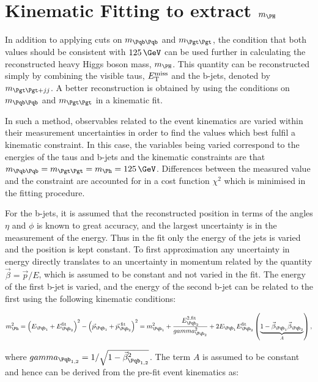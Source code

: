 \section{Kinematic Fitting to extract $m_{\PH}$}
\label{sec:kinematicfit}

In addition to applying cuts on $m_{\Pqb\Pqb}$ and $m_{\Pgt\Pgt}$, the condition that
both values should be consistent with $125\,\GeV$ can be used further in
calculating the reconstructed heavy Higgs boson mass, $m_{\PH}$. This quantity can be reconstructed simply
by combining the visible taus, $E_{\mathrm{T}}^{\text{miss}}$ and the b-jets, denoted by $m_{\Pgt\Pgt+jj}$.
A better reconstruction is obtained by using the conditions on $m_{\Pqb\Pqb}$ and
$m_{\Pgt\Pgt}$ in a kinematic fit. 

In such a method, observables related to the
event kinematics are varied within their measurement uncertainties in order to
find the values which best fulfil a kinematic constraint. In this case, the
variables being varied correspond to the energies of the taus and b-jets and the
kinematic constraints are that $m_{\Pqb\Pqb} = m_{\Pgt\Pgt} = m_{\Ph} = 125\,\GeV$. 
Differences between the measured value and the constraint are accounted for in a cost
function $\chi^{2}$ which is minimised in the fitting procedure.  

For the b-jets, it is assumed that the reconstructed position in terms of the
angles $\eta$ and $\phi$ is known to great accuracy, and the largest
uncertainty is in the measurement of the energy. Thus in the fit only the
energy of the jets is varied and the position is kept constant. To first
approximation any uncertainty in energy directly translates to an uncertainty in
momentum related by the quantity $\vec{\beta} = \vec{p}/E$, which is assumed to be constant and 
not varied in the fit. The energy of the first b-jet is varied, and the
energy of the second b-jet can be related to the first using the following
kinematic conditions:

\begin{equation}
m_{\Ph}^{2} = \left( E_{\Pqb_{1}} + E_{\Pqb_{2}}^{\text{fit}} \right)^{2} -
\left(\vec{p}_{\Pqb_{1}} + \vec{p}_{\Pqb_{2}}^{\text{~fit}}\right)^{2} 
= m_{\Pqb_{1}}^{2} + \frac{E_{\Pqb_{2}}^{2,\text{fit}}}{\gamma_{\Pqb_{2}}^{2}} +
2E_{\Pqb_{1}}E_{\Pqb_{2}}^{\text{fit}}\left(\underbrace{1-\vec{\beta}_{\Pqb_{1}}\vec{\beta}_{\Pqb_{2}}}_{A}\right),   
\label{eq:bjetkinfit}         
\end{equation}

where $\gamma_{\Pqb_{1,2}} = 1/\sqrt{1-\vec{\beta}_{\Pqb_{1,2}}^{2}}$. The term $A$ is
assumed to be constant and hence can be derived from the pre-fit event
kinematics as:

